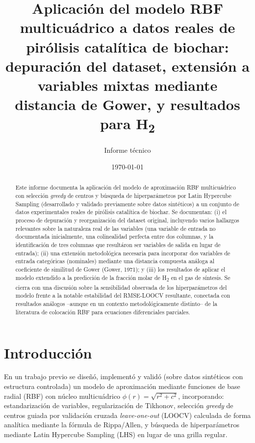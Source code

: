 \documentclass[11pt,a4paper]{article}
\title{\Large \textbf{Aplicaci\'on del modelo RBF multicu\'adrico a datos reales
de pir\'olisis catal\'itica de biochar: \\
depuraci\'on del dataset, extensi\'on a variables mixtas mediante \\
distancia de Gower, y resultados para H\textsubscript{2}}}
\author{Informe t\'ecnico}
\date{\today}
\begin{document}
\maketitle

\begin{abstract}
\noindent
Este informe documenta la aplicaci\'on del modelo de aproximaci\'on RBF
multicu\'adrico con selecci\'on \emph{greedy} de centros y b\'usqueda de
hiperpar\'ametros por Latin Hypercube Sampling (desarrollado y validado
previamente sobre datos sint\'eticos) a un conjunto de datos experimentales
reales de pir\'olisis catal\'itica de biochar. Se documentan: (i) el proceso
de depuraci\'on y reorganizaci\'on del dataset original, incluyendo varios
hallazgos relevantes sobre la naturaleza real de las variables (una variable
de entrada no documentada inicialmente, una colinealidad perfecta entre dos
columnas, y la identificaci\'on de tres columnas que result\'aron ser
variables de salida en lugar de entrada); (ii) una extensi\'on metodol\'ogica
necesaria para incorporar dos variables de entrada categ\'oricas (nominales)
mediante una distancia compuesta an\'aloga al coeficiente de similitud de
Gower (Gower, 1971); y (iii) los resultados de aplicar el modelo extendido a
la predicci\'on de la fracci\'on molar de H\textsubscript{2} en el gas de
s\'intesis. Se cierra con una discusi\'on sobre la sensibilidad observada de
los hiperpar\'ametros del modelo frente a la notable estabilidad del
RMSE-LOOCV resultante, conectada con resultados an\'alogos --aunque en un
contexto metodol\'ogicamente distinto-- de la literatura de colocaci\'on RBF
para ecuaciones diferenciales parciales.
\end{abstract}

\tableofcontents

\section{Introducci\'on}

En un trabajo previo se dise\~n\'o, implement\'o y valid\'o (sobre datos
sint\'eticos con estructura controlada) un modelo de aproximaci\'on mediante
funciones de base radial (RBF) con n\'ucleo multicu\'adrico
$\phi(r)=\sqrt{r^2+c^2}$, incorporando: estandarizaci\'on de variables,
regularizaci\'on de Tikhonov, selecci\'on \emph{greedy} de centros guiada por
validaci\'on cruzada \emph{leave-one-out} (LOOCV) calculada de forma
anal\'itica mediante la f\'ormula de Rippa/Allen, y b\'usqueda de
hiperpar\'ametros mediante Latin Hypercube Sampling (LHS) en lugar de una
grilla regular.
\end{document}
